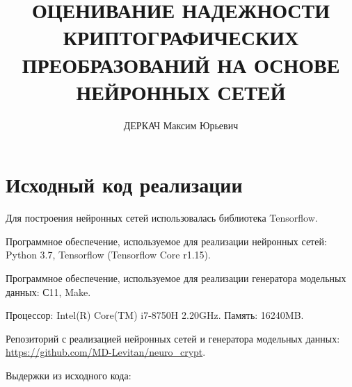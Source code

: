 \documentclass[a4paper,14pt]{extreport}
\title{ОЦЕНИВАНИЕ НАДЕЖНОСТИ КРИПТОГРАФИЧЕСКИХ ПРЕОБРАЗОВАНИЙ НА ОСНОВЕ НЕЙРОННЫХ СЕТЕЙ}
\author{ДЕРКАЧ Максим Юрьевич}
\begin{document}
  \maketitle
  
  {
    \renewcommand{\contentsname}{Оглавление}
    \tableofcontents
  }

  \newpage
  
 \newpage
 
 \newpage
  

  \newpage
  
  \newpage
  
  
  \newpage
  
  \newpage
  
  \newpage
  
  
  \newpage
  
  
  \newpage
  
 
  \newpage
  \section{Исходный код реализации}
  Для построения нейронных сетей использовалась библиотека Tensorflow.
  
  Программное обеспечение, используемое для реализации нейронных сетей: Python 3.7, Tensorflow (Tensorflow Core r1.15).
  
  Программное обеспечение, используемое для реализации генератора модельных данных: С11, Make.
  
  Процессор: Intel(R) Core(TM) i7-8750H 2.20GHz. Память: 16240MB.
  
  Репозиторий с реализацией нейронных сетей и генератора модельных данных: \href{https://github.com/MD-Levitan/neuro_crypt}{https://github.com/MD-Levitan/neuro\_crypt}.
  
	\bigskip
  Выдержки из исходного кода:
  \bigskip
  
  
  
\end{document}
